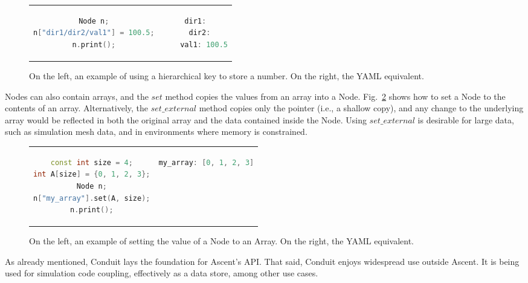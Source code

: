 \begin{figure}
\begin{tabular}{cc}
  \begin{minipage}{.5\textwidth}
  \centering
    \begin{lstlisting}[language=C++]
Node n;
n["dir1/dir2/val1"] = 100.5;
n.print();
    \end{lstlisting}
  \end{minipage}
  &
  \begin{minipage}{.5\textwidth}
  \centering
  \begin{lstlisting}[language=C++]
dir1:
  dir2:
    val1: 100.5
  \end{lstlisting}
  \end{minipage}
\end{tabular}
\caption{\label{ex:2}On the left, an example of using a hierarchical key to store a number. On the right, the YAML equivalent.}
\end{figure}

Nodes can also contain arrays, and the $set$ method
copies the values from an array into a Node.
%
Fig.~\ref{ex:3} shows how to set a Node to the contents of an array.
%
Alternatively, the $set\_external$ method copies only the pointer (i.e., a shallow copy),
and any change to the underlying array would be reflected in both the original
array and the data contained inside the Node.
%
Using $set\_external$ is desirable for large data, such as simulation mesh data,
and in environments where memory is constrained.

\begin{figure}
\begin{tabular}{cc}
  \begin{minipage}{.5\textwidth}
  \centering
    \begin{lstlisting}[language=C++]
const int size = 4;
int A[size] = {0, 1, 2, 3};
Node n;
n["my_array"].set(A, size);
n.print();
    \end{lstlisting}
  \end{minipage}
  &
  \begin{minipage}{.5\textwidth}
  \centering
  \begin{lstlisting}[language=C++]
my_array: [0, 1, 2, 3]
  \end{lstlisting}
  \end{minipage}
\end{tabular}

\caption{\label{ex:3}On the left, an example of setting the value of a Node to an Array. On the right, the YAML equivalent.}
\end{figure}

As already mentioned, Conduit lays the foundation for Ascent's API.
%
That said, Conduit enjoys widespread use outside Ascent.
%
It is being used for simulation code coupling, effectively as a data store, among
other use cases.



